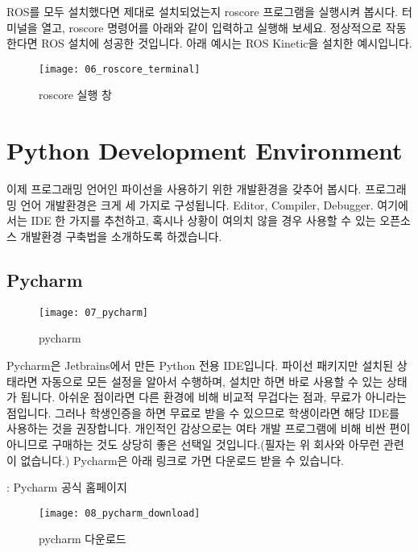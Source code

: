 \documentclass[11pt,fleqn]{book} %
\begin{document}
ROS를 모두 설치했다면 제대로 설치되었는지 roscore 프로그램을 실행시켜 봅시다.
터미널을 열고, roscore 명령어를 아래와 같이 입력하고 실행해 보세요. 정상적으로 작동한다면 ROS 설치에 성공한 것입니다. 아래 예시는 ROS Kinetic을 설치한 예시입니다.

\begin{figure}[h]
\centering\texttt{[image: 06\_roscore\_terminal]}
\caption{roscore 실행 창}
\end{figure}


\section{Python Development Environment}

이제 프로그래밍 언어인 파이선을 사용하기 위한 개발환경을 갖추어 봅시다.
프로그래밍 언어 개발환경은 크게 세 가지로 구성됩니다. Editor, Compiler, Debugger.
여기에서는 IDE 한 가지를 추천하고, 혹시나 상황이 여의치 않을 경우 사용할 수 있는 오픈소스 개발환경 구축법을 소개하도록 하겠습니다.

\subsection{Pycharm}

\begin{figure}[h]
\centering\texttt{[image: 07\_pycharm]}
\caption{pycharm}
\end{figure}

Pycharm은 Jetbrains에서 만든 Python 전용 IDE입니다. 파이선 패키지만 설치된 상태라면 자동으로 모든 설정을 알아서 수행하며, 설치만 하면 바로 사용할 수 있는 상태가 됩니다.
아쉬운 점이라면 다른 환경에 비해 비교적 무겁다는 점과, 무료가 아니라는 점입니다. 그러나 학생인증을 하면 무료로 받을 수 있으므로 학생이라면 해당 IDE를 사용하는 것을 권장합니다.
개인적인 감상으로는 여타 개발 프로그램에 비해 비싼 편이 아니므로 구매하는 것도 상당히 좋은 선택일 것입니다.(필자는 위 회사와 아무런 관련이 없습니다.)
Pycharm은 아래 링크로 가면 다운로드 받을 수 있습니다.

\begin{link}
  : Pycharm 공식 홈페이지
\end{link}

\begin{figure}[h]
\centering\texttt{[image: 08\_pycharm\_download]}
\caption{pycharm 다운로드}
\end{figure}
\end{document}
